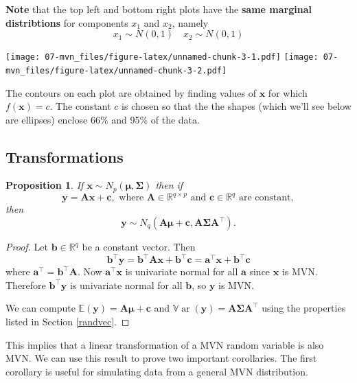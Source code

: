\documentclass[]{book}
\newtheorem{proposition}{Proposition}[chapter]
\theoremstyle{definition}
\theoremstyle{definition}
\theoremstyle{definition}
\theoremstyle{remark}
\begin{document}
\textbf{Note} that the top left and bottom right plots have the \textbf{same marginal distribtions} for components \(x_1\) and \(x_2\), namely
\[x_1 \sim N(0, 1)\quad x_2 \sim N(0, 1)\]

\texttt{[image: 07-mvn\_files/figure-latex/unnamed-chunk-3-1.pdf]} \texttt{[image: 07-mvn\_files/figure-latex/unnamed-chunk-3-2.pdf]}

The contours on each plot are obtained by finding values of \(\mathbf x\) for which \(f(\mathbf x)=c\). The constant \(c\) is chosen so that the the shapes (which we'll see below are ellipses)
enclose 66\% and 95\% of the data.

\hypertarget{transformations}{%
\subsection{Transformations}\label{transformations}}

\begin{proposition}
\protect\hypertarget{prp:six2}{}{\label{prp:six2} } If \(\mathbf x\sim N_p({\boldsymbol{\mu}},\boldsymbol{\Sigma})\) then if \[\mathbf y= \mathbf A\mathbf x+ \mathbf c, \mbox{ where } \mathbf A\in \mathbb{R}^{q \times p} \mbox{ and }\mathbf c\in \mathbb{R}^q
  \mbox{ are constant},\] then
\[\mathbf y\sim N_q(\mathbf A{\boldsymbol{\mu}}+ \mathbf c, \mathbf A\boldsymbol{\Sigma}\mathbf A^\top).\]
\end{proposition}

\begin{proof}
{}Let \(\mathbf b\in \mathbb{R}^q\) be a constant vector. Then
\[ \mathbf b^\top \mathbf y= \mathbf b^\top \mathbf A\mathbf x+ \mathbf b^\top \mathbf c= \mathbf a^\top \mathbf x+ \mathbf b^\top \mathbf c\]
where \(\mathbf a^\top = \mathbf b^\top \mathbf A\). Now \(\mathbf a^\top \mathbf x\) is univariate normal for all \(\mathbf a\) since \(\mathbf x\) is MVN. Therefore \(\mathbf b^\top \mathbf y\) is univariate normal for all \(\mathbf b\), so \(\mathbf y\) is MVN.

We can compute \({\mathbb{E}}(\mathbf y)=\mathbf A{\boldsymbol{\mu}}+\mathbf c\) and \({\mathbb{V}\operatorname{ar}}(\mathbf y)=\mathbf A\boldsymbol{\Sigma}\mathbf A^\top\) using the properties listed in Section \ref{randvec}.
\end{proof}

This implies that a linear transformation of a MVN random variable is also MVN. We can use this result to prove two important corollaries. The first corollary is useful for simulating data from a general MVN distribution.
\end{document}
